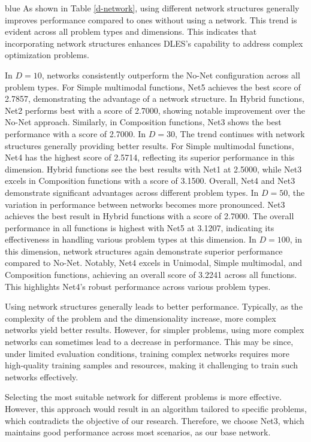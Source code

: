 \documentclass[journal, onecolumn]{IEEEtran}
\begin{document}
\begin{color}{blue}
As shown in Table \ref{d-network}, using different network structures generally improves performance compared to ones without using a network. This trend is evident across all problem types and dimensions. This indicates that incorporating network structures enhances DLES's capability to address complex optimization problems.

In $D=10$, networks consistently outperform the No-Net configuration across all problem types. For Simple multimodal functions, Net5 achieves the best score of 2.7857, demonstrating the advantage of a network structure. In Hybrid functions, Net2 performs best with a score of 2.7000, showing notable improvement over the No-Net approach. Similarly, in Composition functions, Net3 shows the best performance with a score of 2.7000. In $D=30$, The trend continues with network structures generally providing better results. For Simple multimodal functions, Net4 has the highest score of 2.5714, reflecting its superior performance in this dimension. Hybrid functions see the best results with Net1 at 2.5000, while Net3 excels in Composition functions with a score of 3.1500. Overall, Net4 and Net3 demonstrate significant advantages across different problem types. In $D=50$, the variation in performance between networks becomes more pronounced. Net3 achieves the best result in Hybrid functions with a score of 2.7000. The overall performance in all functions is highest with Net5 at 3.1207, indicating its effectiveness in handling various problem types at this dimension. In $D=100$, in this dimension, network structures again demonstrate superior performance compared to No-Net. Notably, Net4 excels in Unimodal, Simple multimodal, and Composition functions, achieving an overall score of 3.2241 across all functions. This highlights Net4's robust performance across various problem types.

Using network structures generally leads to better performance. Typically, as the complexity of the problem and the dimensionality increase, more complex networks yield better results. However, for simpler problems, using more complex networks can sometimes lead to a decrease in performance. This may be since, under limited evaluation conditions, training complex networks requires more high-quality training samples and resources, making it challenging to train such networks effectively.

Selecting the most suitable network for different problems is more effective. However, this approach would result in an algorithm tailored to specific problems, which contradicts the objective of our research. Therefore, we choose Net3, which maintains good performance across most scenarios, as our base network.


\end{color}
\end{document}
